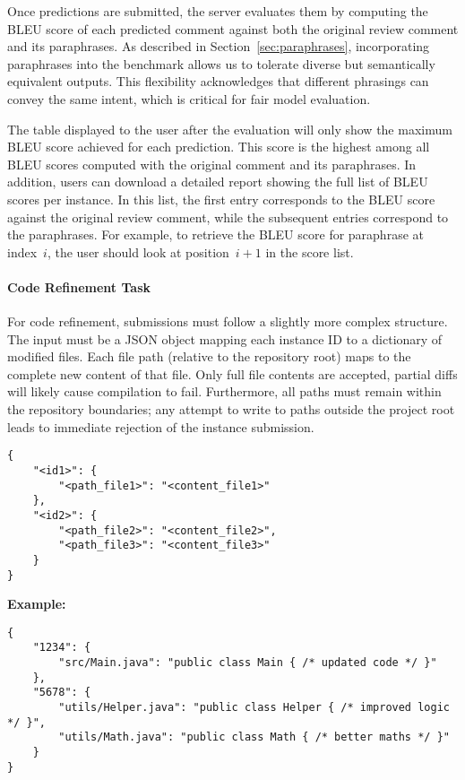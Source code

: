 Once predictions are submitted, the server evaluates them by computing the BLEU score of each
predicted comment against both the original review comment and its paraphrases. As described in
Section~\ref{sec:paraphrases}, incorporating paraphrases into the benchmark allows us to tolerate
diverse but semantically equivalent outputs. This flexibility acknowledges that different phrasings
can convey the same intent, which is critical for fair model evaluation.

The table displayed to the user after the evaluation will only show the maximum BLEU score achieved
for each prediction. This score is the highest among all BLEU scores computed with the original
comment and its paraphrases. In addition, users can download a detailed report showing the full list
of BLEU scores per instance. In this list, the first entry corresponds to the BLEU score against the
original review comment, while the subsequent entries correspond to the paraphrases. For example, to
retrieve the BLEU score for paraphrase at index~$i$, the user should look at position~$i+1$ in the
score list.

\paragraph{Code Refinement Task}

For code refinement, submissions must follow a slightly more complex structure. The input must be a
JSON object mapping each instance ID to a dictionary of modified files. Each file path (relative to
the repository root) maps to the complete new content of that file. Only full file contents are
accepted, partial diffs will likely cause compilation to fail. Furthermore, all paths must remain
within the repository boundaries; any attempt to write to paths outside the project root leads to
immediate rejection of the instance submission.

\begin{verbatim}
{
    "<id1>": {
        "<path_file1>": "<content_file1>"
    },
    "<id2>": {
        "<path_file2>": "<content_file2>",
        "<path_file3>": "<content_file3>"
    }
}
\end{verbatim}

\noindent
\textbf{Example:}

\begin{verbatim}
{
    "1234": {
        "src/Main.java": "public class Main { /* updated code */ }"
    },
    "5678": {
        "utils/Helper.java": "public class Helper { /* improved logic */ }",
        "utils/Math.java": "public class Math { /* better maths */ }"
    }
}
\end{verbatim}


